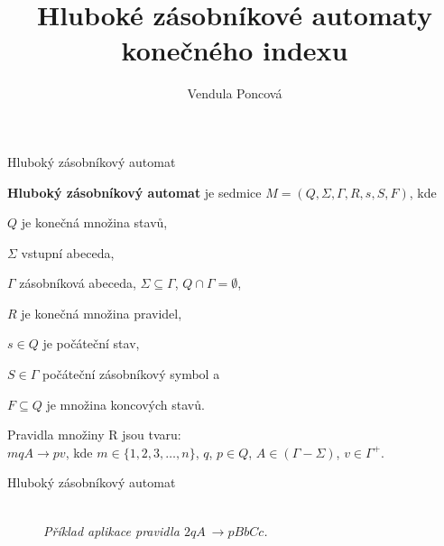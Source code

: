 \documentclass[a4paper,fyma3]{prosper}
\title{Hluboké zásobníkové automaty
	konečného indexu}
\author{Vendula Poncová}
\theoremstyle{definition}
\begin{document}

\maketitle





\begin{slide}{Hluboký zásobníkový automat}

\bigskip

\textbf{Hluboký zásobníkový automat} je sedmice $M = (Q,\Sigma,\Gamma, R, s, S, F)$, kde 
\begin{description*}
 \item[$Q$] je konečná množina stavů, 
 \item[$\Sigma$] vstupní abeceda, 
 \item[$\Gamma$] zásobníková abeceda, $\Sigma \subseteq \Gamma$, $Q \cap \Gamma = \emptyset$,
 \item[$R$] je konečná množina pravidel,
 \item[$s \in Q$] je počáteční stav, 
 \item[$S \in \Gamma$] počáteční zásobníkový symbol a 
 \item[$F \subseteq Q$] je množina koncových stavů.
\end{description*}
\bigskip
Pravidla množiny R jsou tvaru: \\$mqA \rightarrow pv$, kde $m \in \{1, 2, 3,\dots, n\}$, $q$, $p \in Q$, $A \in (\Gamma-\Sigma)$, $v \in {\Gamma}^+$.

\end{slide}
\begin{slide}{Hluboký zásobníkový automat}

\bigskip
\bigskip
\bigskip

\begin{figure}[h!]
\centering
{} \bigskip \\
\emph{Příklad aplikace pravidla $2 q A~\rightarrow p BbCc$.}
\end{figure}


\end{slide}
\end{document}
